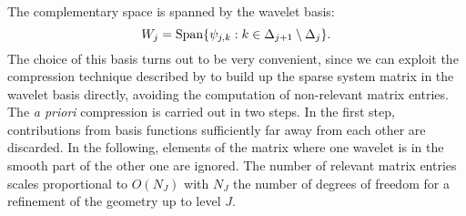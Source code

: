 The complementary space is spanned by the wavelet basis:
\begin{equation} W_j =
  \mathop{}\!\mathrm{Span}\{\psi_{j,k}: k \in \Delta_{j+1}
\setminus \Delta_{j}\}.
\end{equation}
The choice of this basis turns
out to be very convenient, since we can exploit the compression
technique described by \citeauthor{Dahmen2006-pj} to build up the sparse
system matrix in the wavelet basis directly, avoiding the computation of
non-relevant matrix entries.~\autocite{Dahmen2006-pj}
The \emph{a priori} compression is carried out in two steps. In the
first step, contributions from basis functions sufficiently far away
from each other are discarded. In the following, elements of the matrix
where one wavelet is in the smooth part of the other one are ignored.
The number of relevant matrix entries scales proportional to $O(N_J)$ with
$N_J$ the number of degrees of freedom for a refinement of the geometry
up to level $J$.

